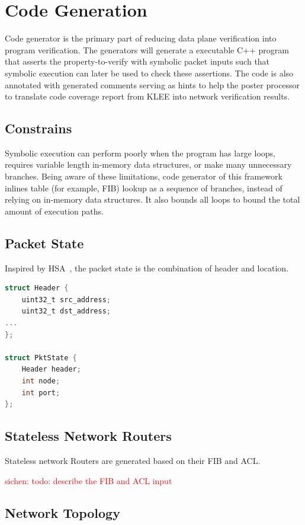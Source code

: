 \documentclass[letterpaper, 10 pt, conference]{ieeeconf}  %
\newcommand\sichen[1]{\textcolor{red}{sichen: #1}}
\begin{document}
\section{Code Generation}\label{sec:codegen}
Code generator is the primary part of reducing data plane verification into program verification. The generators will generate a  executable C++ program that asserts the property-to-verify with symbolic packet inputs such that symbolic execution can later be used to check these assertions. The code is also annotated with generated comments serving as hints to help the poster processor to translate code coverage report from KLEE into network verification results.
\subsection{Constrains}
Symbolic execution can perform poorly when the program has large loops, requires variable length in-memory data structures, or make many unnecessary branches. Being aware of these limitations, code generator of this framework inlines table (for example, FIB) lookup as a sequence of branches, instead of relying on in-memory data structures. It also bounds all loops to bound the total amount of execution paths.

\subsection{Packet State}
Inspired by HSA~\cite{hsa}, the packet state is the combination of header and location.
\begin{lstlisting}[language=C,caption=Packet State,label=code:state,captionpos=b]
struct Header {
	uint32_t src_address;
	uint32_t dst_address;
...
};

struct PktState {
	Header header;
	int node;
	int port;
};
\end{lstlisting}

\subsection{Stateless Network Routers}
Stateless network Routers are generated based on their FIB and ACL.

\sichen{todo: describe the FIB and ACL input}


\subsection{Network Topology}
\end{document}
